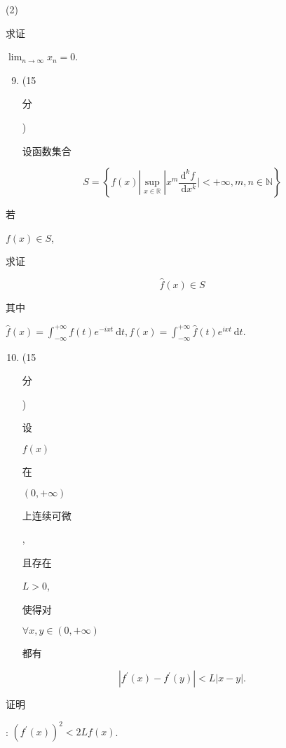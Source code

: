 \documentclass[10pt]{article}
\begin{document}
(2) \begin{CJK}{UTF8}{mj}求证\end{CJK} $\lim _{n \rightarrow \infty} x_{n}=0$.

\begin{enumerate}
  \setcounter{enumi}{8}
  \item (15 \begin{CJK}{UTF8}{mj}分\end{CJK}) \begin{CJK}{UTF8}{mj}设函数集合\end{CJK}
\end{enumerate}
$$
S=\left\{f(x)\left|\sup _{x \in \mathbb{R}}\right| x^{m} \frac{\mathrm{d}^{k} f}{\mathrm{~d} x^{k}} \mid<+\infty, m, n \in \mathbb{N}\right\}
$$
\begin{CJK}{UTF8}{mj}若\end{CJK} $f(x) \in S$, \begin{CJK}{UTF8}{mj}求证\end{CJK}
$$
\hat{f}(x) \in S
$$
\begin{CJK}{UTF8}{mj}其中\end{CJK} $\hat{f}(x)=\int_{-\infty}^{+\infty} f(t) e^{-i x t} \mathrm{~d} t, f(x)=\int_{-\infty}^{+\infty} \hat{f}(t) e^{i x t} \mathrm{~d} t$.

\begin{enumerate}
  \setcounter{enumi}{9}
  \item (15 \begin{CJK}{UTF8}{mj}分\end{CJK}) \begin{CJK}{UTF8}{mj}设\end{CJK} $f(x)$ \begin{CJK}{UTF8}{mj}在\end{CJK} $(0,+\infty)$ \begin{CJK}{UTF8}{mj}上连续可微\end{CJK}, \begin{CJK}{UTF8}{mj}且存在\end{CJK} $L>0$, \begin{CJK}{UTF8}{mj}使得对\end{CJK} $\forall x, y \in(0,+\infty)$ \begin{CJK}{UTF8}{mj}都有\end{CJK}
\end{enumerate}
$$
\left|f^{\prime}(x)-f^{\prime}(y)\right|<L|x-y| .
$$
\begin{CJK}{UTF8}{mj}证明\end{CJK}: $\left(f^{\prime}(x)\right)^{2}<2 L f(x)$.
\end{document}
